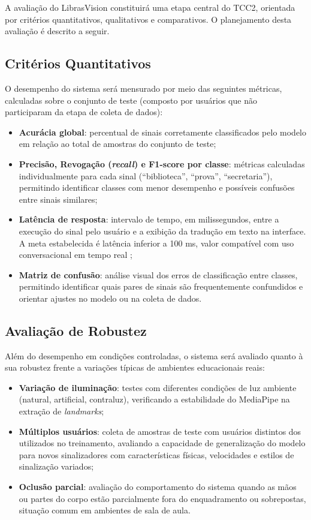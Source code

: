 A avaliação do LibrasVision constituirá uma etapa central do TCC2, orientada por critérios quantitativos, qualitativos e comparativos. O planejamento desta avaliação é descrito a seguir.

\subsection{Critérios Quantitativos}

O desempenho do sistema será mensurado por meio das seguintes métricas, calculadas sobre o conjunto de teste (composto por usuários que não participaram da etapa de coleta de dados):

\begin{itemize}
    \item \textbf{Acurácia global}: percentual de sinais corretamente classificados pelo modelo em relação ao total de amostras do conjunto de teste;
    \item \textbf{Precisão, Revogação (\textit{recall}) e F1-score por classe}: métricas calculadas individualmente para cada sinal (``biblioteca'', ``prova'', ``secretaria''), permitindo identificar classes com menor desempenho e possíveis confusões entre sinais similares;
    \item \textbf{Latência de resposta}: intervalo de tempo, em milissegundos, entre a execução do sinal pelo usuário e a exibição da tradução em texto na interface. A meta estabelecida é latência inferior a 100 ms, valor compatível com uso conversacional em tempo real \cite{attili:24};
    \item \textbf{Matriz de confusão}: análise visual dos erros de classificação entre classes, permitindo identificar quais pares de sinais são frequentemente confundidos e orientar ajustes no modelo ou na coleta de dados.
\end{itemize}

\subsection{Avaliação de Robustez}

Além do desempenho em condições controladas, o sistema será avaliado quanto à sua robustez frente a variações típicas de ambientes educacionais reais:

\begin{itemize}
    \item \textbf{Variação de iluminação}: testes com diferentes condições de luz ambiente (natural, artificial, contraluz), verificando a estabilidade do MediaPipe na extração de \textit{landmarks};
    \item \textbf{Múltiplos usuários}: coleta de amostras de teste com usuários distintos dos utilizados no treinamento, avaliando a capacidade de generalização do modelo para novos sinalizadores com características físicas, velocidades e estilos de sinalização variados;
    \item \textbf{Oclusão parcial}: avaliação do comportamento do sistema quando as mãos ou partes do corpo estão parcialmente fora do enquadramento ou sobrepostas, situação comum em ambientes de sala de aula.
\end{itemize}

